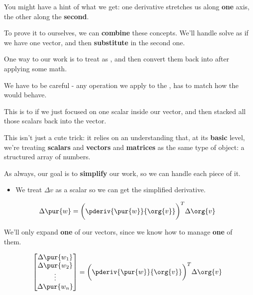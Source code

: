         You might have a hint of what we get: one derivative stretches us along \textbf{one} axis, the other along the \textbf{second}.
        
        To prove it to ourselves, we can \textbf{combine} these concepts. We'll handle solve as if we have one vector, and then \textbf{substitute} in the second one.\\
        
        \begin{concept}
            One way to  our work is to treat  as , and then convert them back into  after applying some math.
            
            We have to be careful - any operation we apply to the , has to match how the  would behave.
            
            This is  to if we just focused on one scalar inside our vector, and then stacked all those scalars back into the vector.
        \end{concept}
        
        This isn't just a cute trick: it relies on an understanding that, at its \textbf{basic} level, we're treating \textbf{scalars} and \textbf{vectors} and \textbf{matrices} as the same type of object: a structured array of numbers.
        
        As always, our goal is to \textbf{simplify} our work, so we can handle each piece of it.
        
        \begin{itemize}
            \item We treat $\Delta v$ as a scalar so we can get the simplified derivative.
        \end{itemize}
            
        \begin{equation}
            \Delta \pur{w}
            =
            \bigg(
                \pderiv{ \pur{w} }{ \org{v} } 
            \bigg)^T
            \Delta \org{v}
        \end{equation}
        
        We'll only expand \textbf{one} of our vectors, since we know how to manage \textbf{one} of them.
        
        \begin{equation}
            \begin{bmatrix}
                \Delta \pur{w_1}\\ \Delta \pur{w_2}\\ \vdots \\ \Delta \pur{w_n}
            \end{bmatrix}
            =
            \bigg(
                \pderiv{ \pur{w} }{ \org{v} } 
            \bigg)^T
            \Delta \org{v}
        \end{equation}
        
